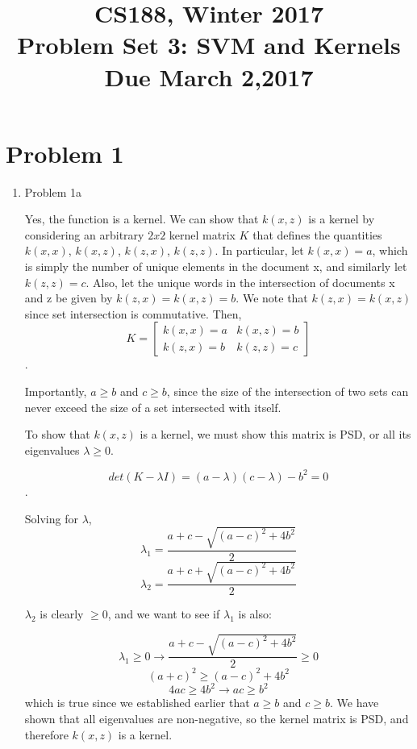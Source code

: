 \documentclass[11pt]{article}
\newcommand{\cnum}{CS188}
\newcommand{\ced}{Winter 2017}
\newcommand{\ctitle}[3]{\title{\vspace{-0.5in}\cnum, \ced\\Problem Set #1: #2\\Due #3}}
\newcommand{\solution}[1]{{{\color{blue}{\bf Solution:} {#1}}}}
\begin{document}
\ctitle{3}{SVM and Kernels}{March 2,2017}
\author{}
\date{}
\maketitle
\vspace{-0.75in}

\section{Problem 1}
\begin{enumerate}
\item Problem 1a

\solution{
Yes, the function is a kernel. We can show that $k(x, z)$ is a kernel by considering an arbitrary $2 x 2$ kernel matrix $K$ that defines the quantities $k(x, x)$, $k(x, z)$, $k(z, x)$, $k(z, z)$. In particular, let $k(x, x) = a$, which is simply the number of unique elements in the document x, and similarly let $k(z, z) = c$. Also, let the unique words in the intersection of documents x and z be given by $k(z, x) = k(x, z) = b$. We note that $k(z, x) = k(x, z)$ since set intersection is commutative. Then, \[ K = \begin{bmatrix} k(x,x) =a & k(x,z) =b \\ k(z,x)=b & k(z,z)=c \end{bmatrix} \] . 

Importantly, $a \geq b$ and $c \geq b$, since the size of the intersection of two sets can never exceed the size of a set intersected with itself. 

To show that $k(x,z)$ is a kernel, we must show this matrix is PSD, or all its eigenvalues $\lambda \geq 0 $. 

\[det(K - \lambda I) = (a - \lambda)(c - \lambda) -b^2 = 0 \]. 

Solving for $\lambda$, 
\[ \lambda_1 = \frac{a + c -\sqrt{(a-c)^2 + 4b^2}}{2} \]
\[ \lambda_2 = \frac{a + c + \sqrt{(a-c)^2 + 4b^2}}{2} \]

$\lambda_2$ is clearly $\geq 0$, and we want to see if $\lambda_1$ is also: 

\[ \lambda_1 \geq 0 \rightarrow{} \frac{a + c - \sqrt{(a-c)^2 + 4b^2}}{2} \geq 0\]
\[(a+c)^2 \geq (a-c)^2 + 4b^2 \]
\[4ac \geq 4b^2 \rightarrow{} ac \geq b^2 \] which is true since we established earlier that $a \geq b$ and $c \geq b$. 
We have shown that all eigenvalues are non-negative, so the kernel matrix is PSD, and therefore $k(x,z)$ is a kernel. 

}


\end{enumerate}
\end{document}
